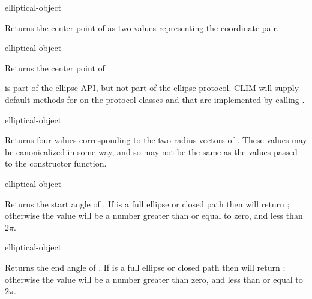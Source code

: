  {elliptical-object}

Returns the center point of  as two values representing
the coordinate pair.

 {elliptical-object}

Returns the center point of .  

 is part of the ellipse API, but not part of the ellipse
protocol.  CLIM will supply default methods for  on the
protocol classes  and  that are implemented by
calling .

 {elliptical-object}

Returns four values corresponding to the two radius vectors of
.  These values may be canonicalized in some way, and so may
not be the same as the values passed to the constructor function.

 {elliptical-object}

Returns the start angle of .  If 
is a full ellipse or closed path then  will return
; otherwise the value will be a number greater than or equal to zero,
and less than $2\pi$.

 {elliptical-object}

Returns the end angle of .  If  is
a full ellipse or closed path then  will return ;
otherwise the value will be a number greater than zero, and less than or equal
to $2\pi$.

